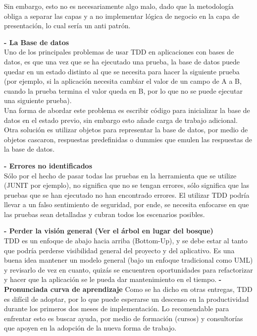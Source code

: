 \begin{flushleft}
\begin{itemize}
Sin embargo, esto no es necesariamente algo malo, dado que la metodología obliga a separar las capas y a no implementar lógica de negocio en la capa de presentación, lo cual sería un anti patrón. 

\textbf{- La Base de datos }
\textbf{}\\
Uno de los principales problemas de usar TDD en aplicaciones con bases de datos, es que una vez que se ha ejecutado una prueba, la base de datos puede quedar en un estado distinto al que se necesita para hacer la siguiente prueba (por ejemplo, si la aplicación necesita cambiar el valor de un campo de A a B, cuando la prueba termina el valor queda en B, por lo que no se puede ejecutar una siguiente prueba). \textbf{}\\

Una forma de abordar este problema es escribir código para inicializar la base de datos en el estado previo, sin embargo esto añade carga de trabajo adicional. \textbf{}\\

Otra solución es utilizar objetos para representar la base de datos, por medio de objetos cascaron, respuestas predefinidas o dummies que emulen las respuestas de la base de datos. 

\textbf{- Errores no identificados }
\textbf{}\\

Sólo por el hecho de pasar todas las pruebas en la herramienta que se utilize (JUNIT por ejemplo), no significa que no se tengan errores, sólo significa que las pruebas que se han ejecutado no han encontrado errores. El utilizar TDD podría llevar a un falso sentimiento de seguridad, por ende, se necesita enfocarse en que las pruebas sean detalladas y cubran todos los escenarios posibles. 

\textbf{-  Perder la visión general (Ver el árbol en lugar del bosque)  }
\textbf{}\\
TDD es un enfoque de abajo hacia arriba (Bottom-Up), y se debe estar al tanto que podría perderse visibilidad general del proyecto y del aplicativo. Es una buena idea mantener un modelo general (bajo un enfoque tradicional como UML) y revisarlo de vez en cuanto, quizás se encuentren oportunidades para refactorizar y hacer que la aplicación se le pueda dar mantenimiento en el tiempo. 
\textbf{-  Pronunciada curva de aprendizaje }
Como se ha dicho en otras entregas, TDD es difícil de adoptar, por lo que puede esperarse un descenso en la productividad durante los primeros dos meses de implementación. Lo recomendable para enfrentar esto es buscar ayuda, por medio de formación (cursos) y consultorías que apoyen en la adopción de la nueva forma de trabajo. 

\end{itemize} 



\end{flushleft}